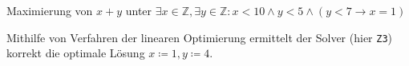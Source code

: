 \begin{listing}[H]
    \inputminted[linenos=true]{bash}{Code/SMT/OMTSimple.smt2}
    \caption{Maximierung von $x + y$ unter $\exists x \in \mathbb{Z}, \exists y \in \mathbb{Z}: x < 10 \land y < 5 \land (y < 7 \rightarrow x = 1)$}
    \label{listing:omtsimple}
\end{listing}

Mithilfe von Verfahren der linearen Optimierung ermittelt der Solver (hier \texttt{Z3}) korrekt die optimale Lösung $x \coloneqq 1, y \coloneqq 4$.